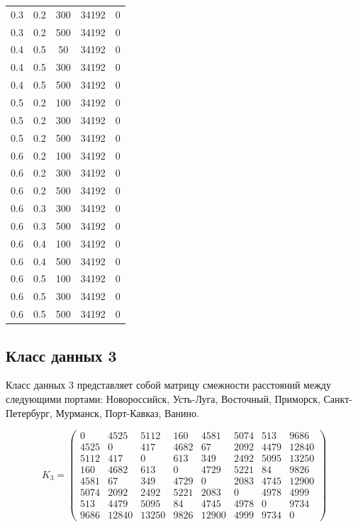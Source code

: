 \begin{center}
\begin{longtable}[c]{|c|c|c|c|c|}
		0.3 &  0.2 &  300 & 34192 &     0 \\
		0.3 &  0.2 &  500 & 34192 &     0 \\ \hline
		0.4 &  0.5 &   50 & 34192 &     0 \\
		0.4 &  0.5 &  300 & 34192 &     0 \\
		0.4 &  0.5 &  500 & 34192 &     0 \\ \hline
		0.5 &  0.2 &  100 & 34192 &     0 \\
		0.5 &  0.2 &  300 & 34192 &     0 \\
		0.5 &  0.2 &  500 & 34192 &     0 \\ \hline
		0.6 &  0.2 &  100 & 34192 &     0 \\
		0.6 &  0.2 &  300 & 34192 &     0 \\
		0.6 &  0.2 &  500 & 34192 &     0 \\ \hline
		0.6 &  0.3 &  300 & 34192 &     0 \\
		0.6 &  0.3 &  500 & 34192 &     0 \\ \hline
		0.6 &  0.4 &  100 & 34192 &     0 \\
		0.6 &  0.4 &  500 & 34192 &     0 \\ \hline
		0.6 &  0.5 &  100 & 34192 &     0 \\
		0.6 &  0.5 &  300 & 34192 &     0 \\
		0.6 &  0.5 &  500 & 34192 &     0 \\ \hline
	\end{longtable}
\end{center}

\subsection{Класс данных 3}
\label{par:class3}

Класс данных 3 представляет собой матрицу смежности расстояний между следующими портами: Новороссийск, Усть-Луга, Восточный, Приморск, Санкт-Петербург, Мурманск, Порт-Кавказ, Ванино\cite{dist}.

\begin{equation}
	\label{eq:kd3}
	K_{3} = \begin{pmatrix}
		0 & 4525 & 5112 & 160 & 4581 & 5074 & 513 & 9686 \\ 
		4525 & 0 & 417 & 4682 & 67 & 2092 & 4479 & 12840 \\ 
		5112 & 417 & 0 & 613 & 349 & 2492 & 5095 & 13250 \\ 
		160 & 4682 & 613 & 0 & 4729 & 5221 & 84 & 9826 \\ 
		4581 & 67 & 349 & 4729 & 0 & 2083 & 4745 & 12900 \\ 
		5074 & 2092 & 2492 & 5221 & 2083 & 0 & 4978 & 4999 \\ 
		513 & 4479 & 5095 & 84 & 4745 & 4978 & 0 & 9734 \\ 
		9686 & 12840 & 13250 & 9826 & 12900 & 4999 & 9734 & 0
	\end{pmatrix}
\end{equation}

